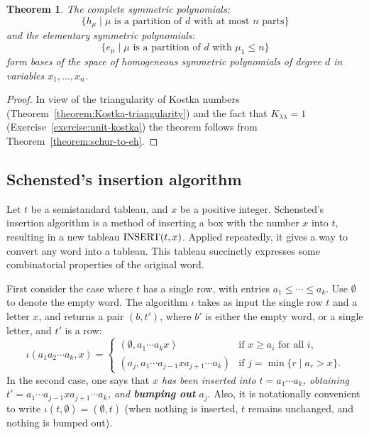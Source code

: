 \documentclass[11pt]{amsproc}
\newtheorem{theorem}{Theorem}[subsection]
\theoremstyle{definition}
\theoremstyle{example}
\newcommand{\rins}{\iota}
\newcommand{\ins}{\textup{INSERT}}
\begin{document}
\begin{theorem}
  The complete symmetric polynomials:
  \begin{displaymath}
    \{h_\mu \mid \text{$\mu$ is a partition of $d$ with at most $n$ parts}\}
  \end{displaymath}
  and the elementary symmetric polynomials:
  \begin{displaymath}
    \{e_\mu\mid \text{$\mu$ is a partition of $d$ with $\mu_1\leq n$}\}
  \end{displaymath}
  form bases of the space of homogeneous symmetric polynomials of degree $d$ in variables $x_1,\dotsc,x_n$.
\end{theorem}
\begin{proof}
  In view of the triangularity of Kostka numbers (Theorem~\ref{theorem:Kostka-triangularity}) and the fact that $K_{\lambda\lambda}=1$ (Exercise~\ref{exercise:unit-kostka}) the theorem follows from Theorem~\ref{theorem:schur-to-eh}.
\end{proof}
\subsection{Schensted's insertion algorithm}
\label{sec:schenst-insert-algor}
Let $t$ be a semistandard tableau, and $x$ be a positive integer.
Schensted's insertion algorithm is a method of inserting a box with the number $x$ into $t$, resulting in a new tableau $\ins(t, x)$.
Applied repeatedly, it gives a way to convert any word into a tableau.
This tableau succinctly expresses some combinatorial properties of the original word.

First consider the case where $t$ has a single row, with entries $a_1\leq \dotsb \leq a_k$.
Use $\emptyset$ to denote the empty word.
The algorithm $\rins$ takes as input the single row $t$ and a letter $x$, and returns a pair $(b, t')$, where $b'$ is either the empty word, or a single letter, and $t'$ is a row:
\begin{displaymath}
  \rins(a_1a_2\dotsb a_k, x) =
  \begin{cases}
    (\emptyset, a_1\dotsb a_k x) & \text{if $x\geq a_i$ for all $i$},\\
    (a_j, a_1\dotsb a_{j-1} x a_{j+1} \dotsb a_k) & \text{if } j = \min\{r \mid a_r > x\}.
  \end{cases}
\end{displaymath}
In the second case, one says that \emph{$x$ has been inserted into $t=a_1\dotsb a_k$, obtaining $t'=a_1\dotsb a_{j-1} x a_{j+1} \dotsb a_k$, and \textbf{bumping out} $a_j$}.
Also, it is notationally convenient to write $\rins(t, \emptyset) = (\emptyset, t)$ (when nothing is inserted, $t$ remains unchanged, and nothing is bumped out).
\end{document}
